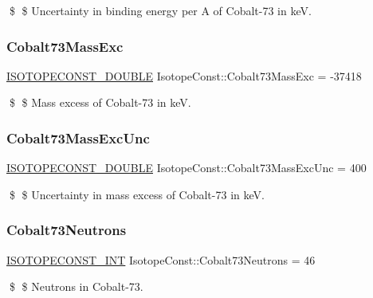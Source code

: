 \$ \$ Uncertainty in binding energy per A of Cobalt-\/73 in keV. \mbox{\label{group___isotope_const-_cobalt-_co73_ga4d8d3cf581ecbb00f1ea8498249d3997}} 
\subsubsection{\texorpdfstring{Cobalt73\+Mass\+Exc}{Cobalt73MassExc}}
{\footnotesize\ttfamily \mbox{\hyperlink{group___isotope_const-_macros_ga8f45a7272ce02c0b4c65c44636ed719a}{I\+S\+O\+T\+O\+P\+E\+C\+O\+N\+S\+T\+\_\+\+D\+O\+U\+B\+LE}} Isotope\+Const\+::\+Cobalt73\+Mass\+Exc = -\/37418}

\$ \$ Mass excess of Cobalt-\/73 in keV. \mbox{\label{group___isotope_const-_cobalt-_co73_ga3ae03ea9bcb90185e91e19873a6ec0b6}} 
\subsubsection{\texorpdfstring{Cobalt73\+Mass\+Exc\+Unc}{Cobalt73MassExcUnc}}
{\footnotesize\ttfamily \mbox{\hyperlink{group___isotope_const-_macros_ga8f45a7272ce02c0b4c65c44636ed719a}{I\+S\+O\+T\+O\+P\+E\+C\+O\+N\+S\+T\+\_\+\+D\+O\+U\+B\+LE}} Isotope\+Const\+::\+Cobalt73\+Mass\+Exc\+Unc = 400}

\$ \$ Uncertainty in mass excess of Cobalt-\/73 in keV. \mbox{\label{group___isotope_const-_cobalt-_co73_ga8a43df0ca1a7d293366f0579ec31b93d}} 
\subsubsection{\texorpdfstring{Cobalt73\+Neutrons}{Cobalt73Neutrons}}
{\footnotesize\ttfamily \mbox{\hyperlink{group___isotope_const-_macros_ga5f18360b3e99483a35c32d789e62621c}{I\+S\+O\+T\+O\+P\+E\+C\+O\+N\+S\+T\+\_\+\+I\+NT}} Isotope\+Const\+::\+Cobalt73\+Neutrons = 46}

\$ \$ Neutrons in Cobalt-\/73. \mbox{\label{group___isotope_const-_cobalt-_co73_ga216e86990e7608852b2e5d41c86776b8}} 
